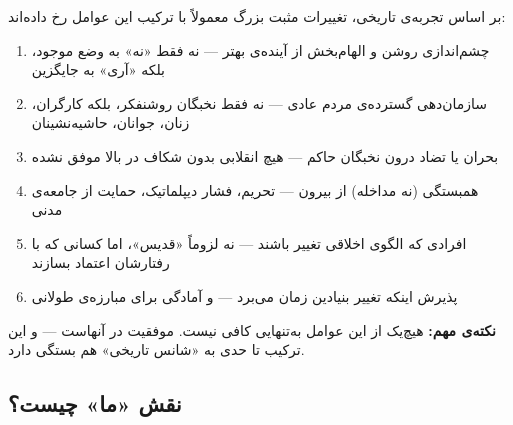 \begin{tcolorbox}[wavebox, title={چه زمانی تغییر مثبت رخ می‌دهد؟}]
بر اساس تجربه‌ی تاریخی، تغییرات مثبت بزرگ معمولاً با ترکیب این عوامل رخ
داده‌اند:

\begin{enumerate}
\item {} چشم‌اندازی روشن و الهام‌بخش از آینده‌ی
  بهتر — نه فقط «نه» به وضع موجود، بلکه «آری» به جایگزین
\item {} سازمان‌دهی گسترده‌ی مردم عادی — نه
  فقط نخبگان روشنفکر، بلکه کارگران، زنان، جوانان، حاشیه‌نشینان
\item {} بحران یا تضاد درون نخبگان حاکم — هیچ
  انقلابی بدون شکاف در بالا موفق نشده
\item {} همبستگی (نه مداخله) از بیرون — تحریم،
  فشار دیپلماتیک، حمایت از جامعه‌ی مدنی
\item {} افرادی که الگوی اخلاقی تغییر باشند — نه
  لزوماً «قدیس»، اما کسانی که با رفتارشان اعتماد بسازند
\item {} پذیرش اینکه تغییر بنیادین زمان می‌برد
  — و آمادگی برای مبارزه‌ی طولانی
\end{enumerate}

\textbf{نکته‌ی مهم:} هیچ‌یک از این عوامل به‌تنهایی کافی نیست. موفقیت در
 آنهاست — و این ترکیب تا حدی به «شانس تاریخی»
هم بستگی دارد.
\end{tcolorbox}


\subsection{نقش «ما» چیست؟}

